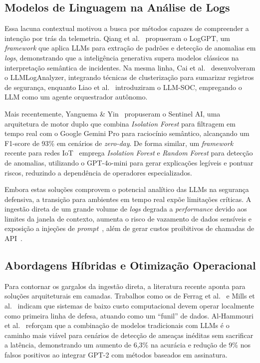 \documentclass[sigconf, anonymous]{acmart}
\begin{document}
\subsection{Modelos de Linguagem na Análise de Logs}
Essa lacuna contextual motivou a busca por métodos capazes de compreender a intenção por trás da telemetria. Qiang et al.~\cite{qiang2023loggpt} propuseram o LogGPT, um \textit{framework} que aplica \acp{LLM} para extração de padrões e detecção de anomalias em \textit{logs}, demonstrando que a inteligência generativa supera modelos clássicos na interpretação semântica de incidentes. Na mesma linha, Cai et al.~\cite{cai2025llm} desenvolveram o LLMLogAnalyzer, integrando técnicas de clusterização para sumarizar registros de segurança, enquanto Liao et al.~\cite{liao2024llmsoc} introduziram o LLM-SOC, empregando o \ac{LLM} como um agente orquestrador autônomo.

Mais recentemente, Yanguema \& Yin~\cite{yanguema_sentinel} propuseram o Sentinel AI, uma arquitetura de motor duplo que combina \textit{Isolation Forest} para filtragem em tempo real com o Google Gemini Pro para raciocínio semântico, alcançando um F1-score de 93\% em cenários de \textit{zero-day}. De forma similar, um \textit{framework} recente para redes IoT~\cite{iot_framework} emprega \textit{Isolation Forest} e \textit{Random Forest} para detecção de anomalias, utilizando o GPT-4o-mini para gerar explicações legíveis e pontuar riscos, reduzindo a dependência de operadores especializados.

Embora estas soluções comprovem o potencial analítico das \acp{LLM} na segurança defensiva, a transição para ambientes em tempo real expõe limitações críticas. A ingestão direta de um grande volume de \textit{logs} degrada a \textit{performance} devido aos limites da janela de contexto, aumenta o risco de vazamento de dados sensíveis e exposição a injeções de \textit{prompt}~\cite{wu2023privacy, yao2024llmsecurity}, além de gerar custos proibitivos de chamadas de \ac{API}~\cite{ferrag2023revolutionizing}.

\subsection{Abordagens Híbridas e Otimização Operacional}
Para contornar os gargalos da ingestão direta, a literatura recente aponta para soluções arquiteturais em camadas. Trabalhos como os de Ferrag et al.~\cite{ferrag2023revolutionizing} e Mills et al.~\cite{mills2024hybrid} indicam que sistemas de baixo custo computacional devem operar localmente como primeira linha de defesa, atuando como um ``funil'' de dados. Al-Hammouri et al.~\cite{al-hammouri2025hybrid} reforçam que a combinação de modelos tradicionais com \acp{LLM} é o caminho mais viável para cenários de detecção de ameaças inéditas sem sacrificar a latência, demonstrando um aumento de 6,3\% na acurácia e redução de 9\% nos falsos positivos ao integrar GPT-2 com métodos baseados em assinatura.
\end{document}
